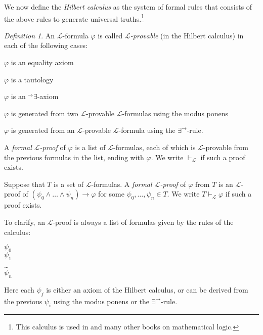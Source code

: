 \documentclass[a4paper, 11pt]{amsart}
\theoremstyle{remark}
\newtheorem{definition}[definition]{Definition}
\newcommand{\cL}{\mathcal L}
\newenvironment{enumerate-(1)}{\begin{enumerate}[label={\upshape (\arabic*)}, leftmargin=2pc]}{\end{enumerate}}
\begin{document}
We now define the \emph{Hilbert calculus} as the system of formal rules that consists of the above rules to generate universal truths.\footnote{This calculus is used in \cite{ziegler2010mathematische} and many other books on mathematical logic.} 


\begin{definition} 
An $\cL$-formula $\varphi$ is called \emph{$\cL$-provable} (in the Hilbert calculus) in each of the following cases: 
\begin{enumerate-(1)} 
\item 
$\varphi$ is an equality axiom 
\item 
$\varphi$ is a tautology 
\item 
$\varphi$ is an ${}^\rightarrow\exists$-axiom 
\item 
$\varphi$ is generated from two $\cL$-provable $\cL$-formulas using the modus ponens 
\item 
$\varphi$ is generated from an $\cL$-provable $\cL$-formula using the $\exists^\rightarrow$-rule. 
\end{enumerate-(1)} 


A \emph{formal $\cL$-proof} of $\varphi$ is a list of $\cL$-formulas, each of which is $\cL$-provable from the previous formulas in the list, ending with $\varphi$. 
We write $\vdash_\cL$ if such a proof exists. 

Suppose that $T$ is a set of $\cL$-formulas. 
A \emph{formal $\cL$-proof} of $\varphi$ from $T$ is an $\cL$-proof of $(\psi_0\wedge \dots \wedge \psi_n)\rightarrow \varphi$ for some $\psi_0,\dots,\psi_n\in T$. 
We write $T \vdash_\cL \varphi$ if such a proof exists. 
\end{definition} 


To clarify, an $\cL$-proof is always a list of formulas given by the rules of the calculus: 

\noindent 
$\psi_0$ \\ 
$\psi_1$ \\ 
\dots \\ 
$\psi_n$ 

Here each $\psi_j$ is either an axiom of the Hilbert calculus, or can be derived from the previous $\psi_i$ using the modus ponens or the $\exists^\rightarrow$-rule. 




\bigskip 
\end{document}
